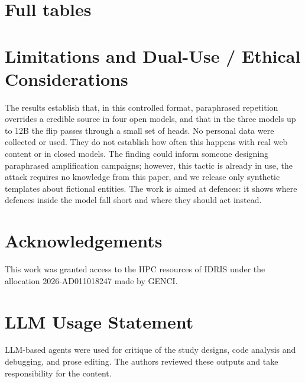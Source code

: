 \documentclass[11pt]{article}
\begin{document}
\section{Full tables}\label{app:tables}



\section{Limitations and Dual-Use / Ethical Considerations}
The results establish that, in this controlled format, paraphrased repetition overrides a credible source in four open models, and that in the three models up to 12B the flip passes through a small set of heads. No personal data were collected or used. They do not establish how often this happens with real web content or in closed models. The finding could inform someone designing paraphrased amplification campaigns; however, this tactic is already in use, the attack requires no knowledge from this paper, and we release only synthetic templates about fictional entities. The work is aimed at defences: it shows where defences inside the model fall short and where they should act instead.

\section{Acknowledgements}
This work was granted access to the HPC resources of IDRIS under the allocation 2026-AD011018247 made by GENCI.

\section{LLM Usage Statement}
LLM-based agents were used for critique of the study designs, code analysis and debugging, and prose editing. The authors reviewed these outputs and take responsibility for the content.
\end{document}
